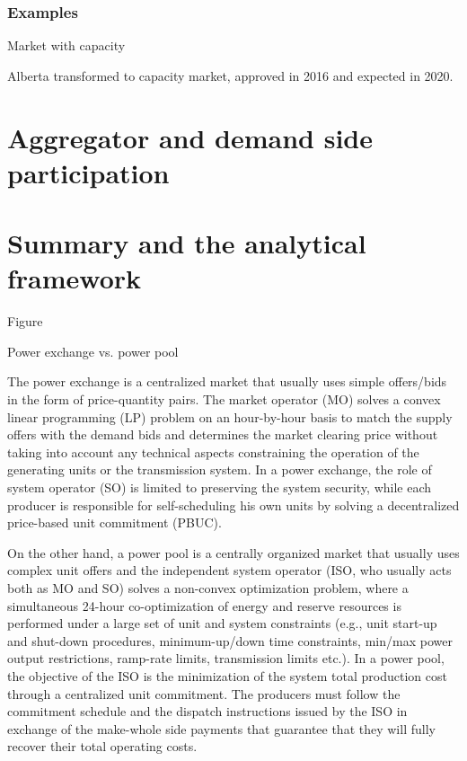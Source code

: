 \subsubsection{Examples}
Market with capacity

Alberta transformed to capacity market, approved in 2016 and expected in 2020.


\section{Aggregator and demand side participation}



\section{Summary and the analytical framework}


Figure



Power exchange vs. power pool

The power exchange is a centralized market that usually uses simple offers/bids in the form of price-quantity pairs. The market operator (MO) solves a convex linear programming (LP) problem on an hour-by-hour basis to match the supply offers with the demand bids and determines the market clearing price without taking into account any technical aspects constraining the operation of the generating units or the transmission system. In a power exchange, the role of system operator (SO) is limited to preserving the system security, while each producer is responsible for self-scheduling his own units by solving a decentralized price-based unit commitment (PBUC).

On the other hand, a power pool is a centrally organized market that usually uses complex unit offers and the independent system operator (ISO, who usually acts both as MO and SO) solves a non-convex optimization problem, where a simultaneous 24-hour co-optimization of energy and reserve resources is performed under a large set of unit and system constraints (e.g., unit start-up and shut-down procedures, minimum-up/down time constraints, min/max power output restrictions, ramp-rate limits, transmission limits etc.). In a power pool, the objective of the ISO is the minimization of the system total production cost through a centralized unit commitment. The producers must follow the commitment schedule and the dispatch instructions issued by the ISO in exchange of the make-whole side payments that guarantee that they will fully recover their total operating costs.


